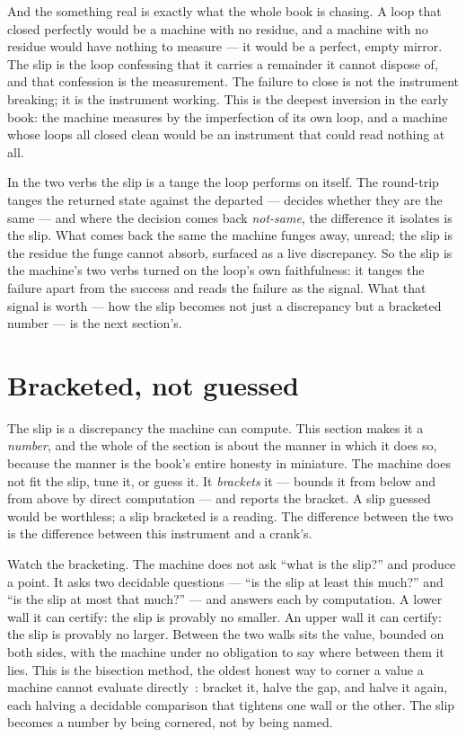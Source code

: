 And the something real is exactly what the whole book is chasing. A loop that closed perfectly would be a machine with
no residue, and a machine with no residue would have nothing to measure --- it would be a perfect, empty mirror. The
slip is the loop confessing that it carries a remainder it cannot dispose of, and that confession is the measurement.
The failure to close is not the instrument breaking; it is the instrument working. This is the deepest inversion in the
early book: the machine measures by the imperfection of its own loop, and a machine whose loops all closed clean would
be an instrument that could read nothing at all.

In the two verbs the slip is a tange the loop performs on itself. The round-trip tanges the returned state against the
departed --- decides whether they are the same --- and where the decision comes back \emph{not-same}, the difference it
isolates is the slip. What comes back the same the machine funges away, unread; the slip is the residue the funge cannot
absorb, surfaced as a live discrepancy. So the slip is the machine's two verbs turned on the loop's own faithfulness: it
tanges the failure apart from the success and reads the failure as the signal. What that signal is worth --- how the
slip becomes not just a discrepancy but a bracketed number --- is the next section's.

\section{Bracketed, not guessed}

The slip is a discrepancy the machine can compute. This section makes it a \emph{number}, and the whole of the section
is about the manner in which it does so, because the manner is the book's entire honesty in miniature. The machine does
not fit the slip, tune it, or guess it. It \emph{brackets} it --- bounds it from below and from above by direct
computation --- and reports the bracket. A slip guessed would be worthless; a slip bracketed is a reading. The
difference between the two is the difference between this instrument and a crank's.

Watch the bracketing. The machine does not ask ``what is the slip?'' and produce a point. It asks two decidable
questions --- ``is the slip at least this much?'' and ``is the slip at most that much?'' --- and answers each by
computation. A lower wall it can certify: the slip is provably no smaller. An upper wall it can certify: the slip is
provably no larger. Between the two walls sits the value, bounded on both sides, with the machine under no obligation to
say where between them it lies. This is the bisection method, the oldest honest way to corner a value a machine cannot
evaluate directly~\cite{trefethen1997}: bracket it, halve the gap, and halve it again, each halving a decidable
comparison that tightens one wall or the other. The slip becomes a number by being cornered, not by being named.

